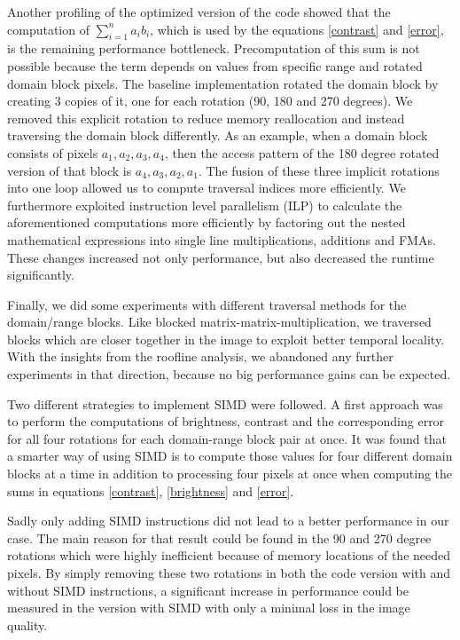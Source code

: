Another profiling of the optimized version of the code showed that the computation of $\sum_{i=1}^n a_i b_i$, which is used by the equations 
\ref{contrast} and \ref{error}, is the remaining performance bottleneck. Precomputation of this sum is not possible
because the term depends on values from specific range and rotated domain block pixels. The baseline implementation rotated
the domain block by creating 3 copies of it, one for each rotation (90, 180 and 270 degrees). We removed this explicit rotation
to reduce memory reallocation and instead traversing the domain block differently. As an example, when a domain block consists
of pixels $a_1, a_2, a_3, a_4$, then the access pattern of the 180 degree rotated version of that block is $a_4, a_3, a_2, a_1$.
The fusion of these three implicit rotations into one loop allowed us to compute traversal indices more efficiently.
We furthermore exploited instruction level parallelism (ILP) to calculate the aforementioned computations more efficiently
by factoring out the nested mathematical expressions into single line multiplications, additions and FMAs.
These changes increased not only performance, but also decreased the runtime significantly.

Finally, we did some experiments with different traversal methods for the domain/range blocks. Like blocked matrix-matrix-multiplication,
we traversed blocks which are closer together in the image to exploit better temporal locality.
With the insights from the roofline analysis, we abandoned any further experiments in that direction, because no big performance
gains can be expected.

 Two different strategies to implement SIMD were
followed. A first approach was to perform the computations of brightness,
contrast and the corresponding error for all four rotations for each
domain-range block pair at once. It was found that a smarter way of using SIMD
is to compute those values for four different domain blocks at a time in
addition to processing four pixels at once when computing the sums in equations
\ref{contrast}, \ref{brightness} and \ref{error}.

Sadly only adding SIMD instructions did not lead to a better performance in our
case. The main reason for that result could be found in the 90 and 270 degree
rotations which were highly inefficient because of memory locations of the
needed pixels. By simply removing these two rotations in both the code version
with and without SIMD instructions, a significant increase in performance could
be measured in the version with SIMD with only a minimal loss in the image
quality.

